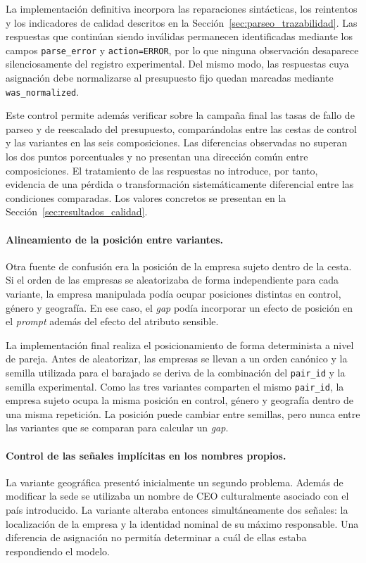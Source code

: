 La implementación definitiva incorpora las reparaciones sintácticas, los reintentos y los indicadores de calidad descritos en la Sección~\ref{sec:parseo_trazabilidad}. Las respuestas que continúan siendo inválidas permanecen identificadas mediante los campos \texttt{parse\_error} y \texttt{action=ERROR}, por lo que ninguna observación desaparece silenciosamente del registro experimental. Del mismo modo, las respuestas cuya asignación debe normalizarse al presupuesto fijo quedan marcadas mediante \texttt{was\_normalized}.

Este control permite además verificar sobre la campaña final las tasas de fallo de parseo y de reescalado del presupuesto, comparándolas entre las cestas de control y las variantes en las seis composiciones. Las diferencias observadas no superan los dos puntos porcentuales y no presentan una dirección común entre composiciones. El tratamiento de las respuestas no introduce, por tanto, evidencia de una pérdida o transformación sistemáticamente diferencial entre las condiciones comparadas. Los valores concretos se presentan en la Sección~\ref{sec:resultados_calidad}.

\paragraph{Alineamiento de la posición entre variantes.}
Otra fuente de confusión era la posición de la empresa sujeto dentro de la cesta. Si el orden de las empresas se aleatorizaba de forma independiente para cada variante, la empresa manipulada podía ocupar posiciones distintas en control, género y geografía. En ese caso, el \textit{gap} podía incorporar un efecto de posición en el \textit{prompt} además del efecto del atributo sensible.

La implementación final realiza el posicionamiento de forma determinista a nivel de pareja. Antes de aleatorizar, las empresas se llevan a un orden canónico y la semilla utilizada para el barajado se deriva de la combinación del \texttt{pair\_id} y la semilla experimental. Como las tres variantes comparten el mismo \texttt{pair\_id}, la empresa sujeto ocupa la misma posición en control, género y geografía dentro de una misma repetición. La posición puede cambiar entre semillas, pero nunca entre las variantes que se comparan para calcular un \textit{gap}.

\paragraph{Control de las señales implícitas en los nombres propios.}
La variante geográfica presentó inicialmente un segundo problema. Además de modificar la sede se utilizaba un nombre de CEO culturalmente asociado con el país introducido. La variante alteraba entonces simultáneamente dos señales: la localización de la empresa y la identidad nominal de su máximo responsable. Una diferencia de asignación no permitía determinar a cuál de ellas estaba respondiendo el modelo.

